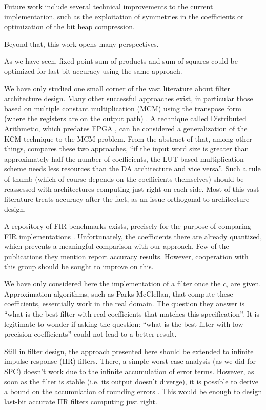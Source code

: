 \documentclass[twocolumn]{IEEEtran}
\begin{document}
Future work include several technical improvements to the current implementation, such as the exploitation of symmetries in the coefficients or optimization of the bit heap compression.

Beyond that, this work opens many perspectives.

 As we have seen, fixed-point sum of products and sum of squares could be optimized for last-bit accuracy using the same approach.  

 We have only studied one small corner of the vast literature about  filter architecture design. 
Many other successful approaches exist, in particular those based on multiple constant multiplication (MCM) using the transpose form (where the registers are on the output path)
\cite{Potkonjak94,BouTis2005:IEEETC,Mehendale95,VoronenkoPuschel2007,AskoyEtAl:2008}. 
A technique called Distributed Arithmetic, which predates FPGA \cite{White1989:DA}, can  be considered  a  generalization of the KCM technique to the MCM problem. 
From the abstract of \cite{2013-ReCoSoc-Kumm-DAvsKCM} that, among other things, compares these two approaches,  ``if the input word size is greater than approximately half the number of coefficients, the LUT based multiplication scheme needs less resources than the DA architecture and vice versa''. 
Such a rule of thumb (which of course  depends on the coefficients themselves) should be reassessed with architectures computing just right on each side.
Most of this vast literature treats  accuracy after the fact,  as an issue orthogonal to architecture design.

A repository of FIR benchmarks exists, precisely for the purpose of comparing FIR implementations \cite{FirSuite}. 
Unfortunately, the coefficients there are already quantized, which prevents a meaningful comparison with our approach.
Few of the publications they mention report accuracy results.
However, cooperation with this group should be sought to improve on this.


 We have only considered here the implementation of a filter once the $c_i$ are given. 
  Approximation algorithms, such as Parks-McClellan, that compute these coefficients, essentially work in the real domain. 
  The question they answer is ``what is the best filter with real coefficients that matches this specification''.
  It is legitimate to wonder if asking the question: ``what is the best filter with low-precision coefficients''  could not lead to a better result.

 Still in filter design, the approach presented here should be extended to  infinite impulse response (IIR) filters. 
  There, a simple worst-case analysis (as we did for SPC) doesn't work  due to the infinite accumulation of error terms. 
  However, as soon as the filter is stable (i.e. its output doesn't diverge), it is possible to derive a bound on the accumulation of rounding errors \cite{2012-HilaireLopezLSD-DASIP}.
  This would be enough to design last-bit accurate IIR filters computing just right.
\newpage
\end{document}
